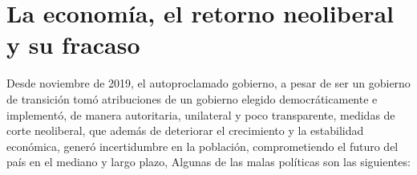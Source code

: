 \documentclass[a4paper, nobind]{templates/ociamthesis}
\begin{document}
\hypertarget{la-economuxeda-el-retorno-neoliberal-y-su-fracaso}{%
\chapter{La economía, el retorno neoliberal y su fracaso}\label{la-economuxeda-el-retorno-neoliberal-y-su-fracaso}}

Desde noviembre de 2019, el autoproclamado gobierno, a pesar de ser un gobierno de transición tomó atribuciones de un gobierno elegido democráticamente e implementó, de manera autoritaria, unilateral y poco transparente, medidas de corte neoliberal, que además de deteriorar el crecimiento y la estabilidad económica, generó incertidumbre en la población, comprometiendo el futuro del país en el mediano y largo plazo, Algunas de las malas políticas son las siguientes:
\end{document}

